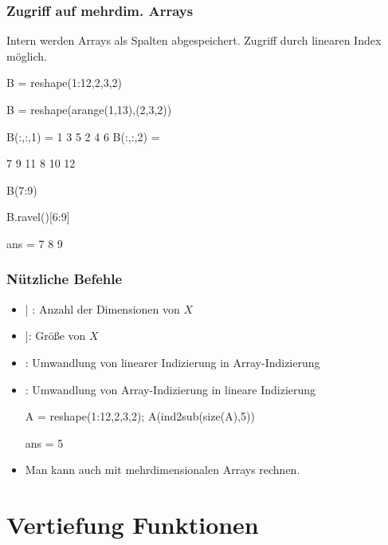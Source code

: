\documentclass[hyperref={xetex}]{beamer}
\begin{document}
%
%
\begin{frame}[fragile]\frametitle{Zugriff auf mehrdim. Arrays}
Intern werden Arrays als Spalten abgespeichert. Zugriff durch linearen
  Index m\"oglich. 
\begin{matlabin}
B = reshape(1:12,2,3,2)
\end{matlabin}
\begin{pyin}
B = reshape(arange(1,13),(2,3,2))  
\end{pyin}
\begin{matlab}
B(:,:,1) =
     1     3     5
     2     4     6
B(:,:,2) =

     7     9    11
     8    10    12
\end{matlab}
\begin{matlabin}
B(7:9)
\end{matlabin}
\begin{pyin}
B.ravel()[6:9]  
\end{pyin}
\begin{matlab}
ans =
     7     8     9
\end{matlab}
\end{frame}
%
% 
\begin{frame}[fragile]\frametitle{N\"utzliche Befehle}
\begin{itemize}
  \item {}| : Anzahl der Dimensionen von $X$ 
  \item {}|: Gr\"o{\ss}e von $X$ 
  \item {}: Umwandlung von linearer Indizierung in Array-Indizierung 
  \item {}: Umwandlung von Array-Indizierung in lineare Indizierung
\begin{matlabin}
A = reshape(1:12,2,3,2);
A(ind2sub(size(A),5))
\end{matlabin}
\begin{matlab}
ans =
     5
\end{matlab}
\item Man kann auch mit mehrdimensionalen Arrays rechnen.
\end{itemize}

\end{frame}
%



\section{Vertiefung Funktionen}
\end{document}
